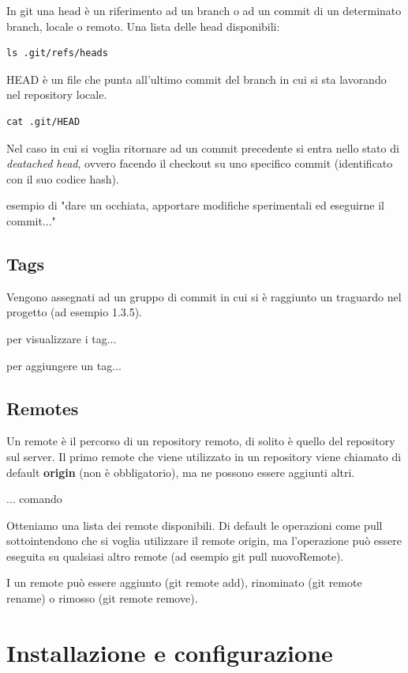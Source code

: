 \documentclass{article} \usepackage[textwidth=18cm,textheight=18cm]{geometry}
\begin{document}
In git una head è un riferimento ad un branch o ad un commit di un determinato
branch, locale o remoto. Una lista delle head disponibili:

\begin{verbatim}
ls .git/refs/heads
\end{verbatim}

HEAD è un file che punta all'ultimo commit del branch in cui si sta lavorando
nel repository locale.

\begin{verbatim}
cat .git/HEAD
\end{verbatim}

Nel caso in cui si voglia ritornare ad un commit precedente si entra nello stato
di \emph{deatached head}, ovvero facendo il checkout su uno specifico commit
(identificato con il suo codice hash).

esempio di "dare un occhiata, apportare modifiche sperimentali ed eseguirne il
commit..."

\subsection{Tags}

Vengono assegnati ad un gruppo di commit in cui si è raggiunto un traguardo nel
progetto (ad esempio 1.3.5).

per visualizzare i tag...

per aggiungere un tag...

\subsection{Remotes}

Un remote è il percorso di un repository remoto, di solito è quello del
repository sul server. Il primo remote che viene utilizzato in un repository
viene chiamato di default \textbf{origin} (non è obbligatorio), ma ne possono
essere aggiunti altri.

... comando

Otteniamo una lista dei remote disponibili. Di default le operazioni come pull
sottointendono che si voglia utilizzare il remote origin, ma l'operazione può
essere eseguita su qualsiasi altro remote (ad esempio git pull nuovoRemote).

I un remote può essere aggiunto (git remote add), rinominato (git remote rename)
o rimosso (git remote remove).

\section{Installazione e configurazione}
\end{document}
